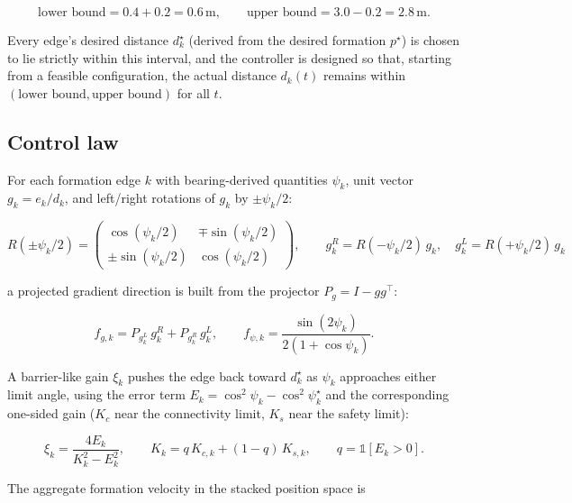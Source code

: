 \documentclass[11pt]{article}
\begin{document}
\begin{equation}
    \text{lower bound} = 0.4 + 0.2 = 0.6\,\text{m}, \qquad
    \text{upper bound} = 3.0 - 0.2 = 2.8\,\text{m}.
\end{equation}

Every edge's desired distance $d_k^\star$ (derived from the desired formation
$p^\star$) is chosen to lie strictly within this interval, and the controller
is designed so that, starting from a feasible configuration, the actual
distance $d_k(t)$ remains within $(\text{lower bound}, \text{upper bound})$
for all $t$.

\subsection{Control law}

For each formation edge $k$ with bearing-derived quantities
$\psi_k$, unit vector $g_k = e_k / d_k$, and left/right rotations of $g_k$ by
$\pm\psi_k/2$:

\begin{equation}
    R(\pm\psi_k/2) =
    \begin{pmatrix}
        \cos(\psi_k/2) & \mp\sin(\psi_k/2) \\
        \pm\sin(\psi_k/2) & \cos(\psi_k/2)
    \end{pmatrix},
    \qquad
    g_{k}^{R} = R(-\psi_k/2)\,g_k,\quad g_{k}^{L} = R(+\psi_k/2)\,g_k
\end{equation}

a projected gradient direction is built from the projector
$P_g = I - g g^\top$:

\begin{equation}
    f_{g,k} = P_{g_k^{L}}\, g_k^{R} + P_{g_k^{R}}\, g_k^{L}, \qquad
    f_{\psi,k} = \frac{\sin(2\psi_k)}{2(1+\cos\psi_k)}.
\end{equation}

A barrier-like gain $\xi_k$ pushes the edge back toward $d_k^\star$ as
$\psi_k$ approaches either limit angle, using the error term
$E_k = \cos^2\psi_k - \cos^2\psi_k^\star$ and the corresponding one-sided gain
($K_c$ near the connectivity limit, $K_s$ near the safety limit):

\begin{equation}
    \xi_k = \frac{4 E_k}{K_k^2 - E_k^2}, \qquad
    K_k = q\,K_{c,k} + (1-q)\,K_{s,k}, \qquad
    q = \mathbb{1}[E_k > 0].
\end{equation}

The aggregate formation velocity in the stacked position space is
\end{document}
